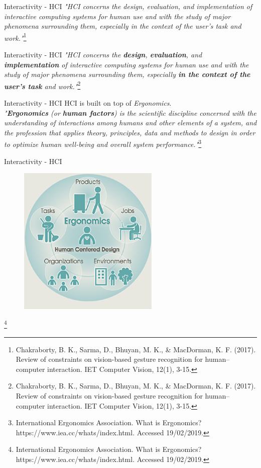 \documentclass{beamer}
\newcommand\blfootnote[1]{%
  \begingroup
  \renewcommand\thefootnote{}\footnote{#1}%
  \addtocounter{footnote}{-1}%
  \endgroup
}
\begin{document}
\begin{frame}{Interactivity - HCI} 
   \textit{"HCI concerns the design, evaluation, and implementation of interactive  computing  systems  for human  use  and  with  the  study  of  major  phenomena  surrounding them, especially in the context of the user’s task and work."}\footnote{Chakraborty, B. K., Sarma, D., Bhuyan, M. K., \& MacDorman, K. F. (2017). Review of constraints on vision-based gesture recognition for human–computer interaction. IET Computer Vision, 12(1), 3-15.}
\end{frame}

\begin{frame}{Interactivity - HCI} 
   \textit{"HCI concerns the \textbf{design}, \textbf{evaluation}, and \textbf{implementation} of interactive  computing  systems  for human  use  and  with  the  study  of  major  phenomena  surrounding them, especially \textbf{in the context of the user’s task} and work."}\footnote{Chakraborty, B. K., Sarma, D., Bhuyan, M. K., \& MacDorman, K. F. (2017). Review of constraints on vision-based gesture recognition for human–computer interaction. IET Computer Vision, 12(1), 3-15.}
\end{frame}

\begin{frame}{Interactivity - HCI} 
    HCI is built on top of \textit{Ergonomics}.\\
    \vspace{5mm}
    \textit{"\textbf{Ergonomics} (or \textbf{human factors}) is the scientific discipline concerned with the understanding of interactions among humans and other elements of a system, and the profession that applies theory, principles, data and methods to design in order to optimize human well-being and overall system performance."}\footnote{International Ergonomics Association. What is Ergonomics? https://www.iea.cc/whats/index.html. Accessed 19/02/2019.}
\end{frame}

\begin{frame}{Interactivity - HCI} 
    \begin{figure}[h]
        \includegraphics[width=0.6\textwidth]{ergonomics.png}
    \end{figure}\blfootnote{International Ergonomics Association. What is Ergonomics? https://www.iea.cc/whats/index.html. Accessed 19/02/2019.}
\end{frame}
\end{document}
